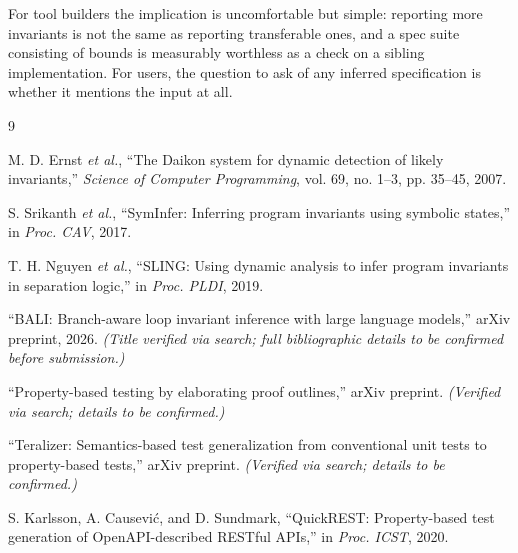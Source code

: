 \documentclass[conference]{IEEEtran}
\begin{document}
For tool builders the implication is uncomfortable but simple: reporting more invariants is
not the same as reporting transferable ones, and a spec suite consisting of bounds is
measurably worthless as a check on a sibling implementation. For users, the question to ask
of any inferred specification is whether it mentions the input at all.

\begin{thebibliography}{9}

M. D. Ernst \textit{et al.}, ``The Daikon system for dynamic detection of likely
invariants,'' \textit{Science of Computer Programming}, vol. 69, no. 1--3, pp. 35--45, 2007.

S. Srikanth \textit{et al.}, ``SymInfer: Inferring program invariants using symbolic
states,'' in \textit{Proc. CAV}, 2017.

T. H. Nguyen \textit{et al.}, ``SLING: Using dynamic analysis to infer program invariants
in separation logic,'' in \textit{Proc. PLDI}, 2019.

``BALI: Branch-aware loop invariant inference with large language models,'' arXiv preprint,
2026. \textit{(Title verified via search; full bibliographic details to be confirmed before
submission.)}

``Property-based testing by elaborating proof outlines,'' arXiv preprint.
\textit{(Verified via search; details to be confirmed.)}

``Teralizer: Semantics-based test generalization from conventional unit tests to
property-based tests,'' arXiv preprint. \textit{(Verified via search; details to be
confirmed.)}

S. Karlsson, A. Causevi\'c, and D. Sundmark, ``QuickREST: Property-based test generation of
OpenAPI-described RESTful APIs,'' in \textit{Proc. ICST}, 2020.

\end{thebibliography}
\end{document}
